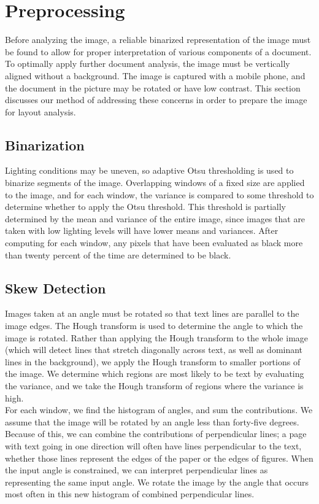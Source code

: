 \documentclass{report}
\begin{document}
\section{Preprocessing}
Before analyzing the image, a reliable binarized representation of the image must be found to allow for proper interpretation of various components of a document. To optimally apply further document analysis, the image must be vertically aligned without a background. The image is captured with a mobile phone, and the document in the picture may be rotated or have low contrast. This section discusses our method of addressing these concerns in order to prepare the image for layout analysis.

\subsection{Binarization}
Lighting conditions may be uneven, so adaptive Otsu thresholding is used to binarize segments of the image. Overlapping windows of a fixed size are applied to the image, and for each window, the variance is compared to some threshold to determine whether to apply the Otsu threshold. This threshold is partially determined by the mean and variance of the entire image, since images that are taken with low lighting levels will have lower means and variances. After computing for each window, any pixels that have been evaluated as black more than twenty percent of the time are determined to be black.

\subsection{Skew Detection}
Images taken at an angle must be rotated so that text lines are parallel to the image edges. The Hough transform is used to determine the angle to which the image is rotated. Rather than applying the Hough transform to the whole image (which will detect lines that stretch diagonally across text, as well as dominant lines in the background), we apply the Hough transform to smaller portions of the image. We determine which regions are most likely to be text by evaluating the variance, and we take the Hough transform of regions where the variance is high.  \\
For each window, we find the histogram of angles, and sum the contributions. We assume that the image will be rotated by an angle less than forty-five degrees. Because of this, we can combine the contributions of perpendicular lines; a page with text going in one direction will often have lines perpendicular to the text, whether those lines represent the edges of the paper or the edges of figures. When the input angle is constrained, we can interpret perpendicular lines as representing the same input angle. We rotate the image by the angle that occurs most often in this new histogram of combined perpendicular lines.
\end{document}
